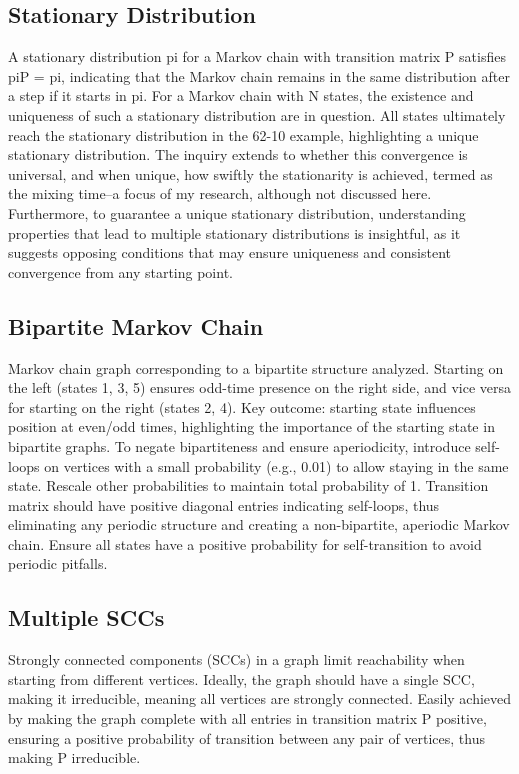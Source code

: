 \subsection*{Stationary Distribution}
A stationary distribution pi for a Markov chain with transition matrix P satisfies piP = pi, indicating that the Markov chain remains in the same distribution after a step if it starts in pi.
For a Markov chain with N states, the existence and uniqueness of such a stationary distribution are in question.
All states ultimately reach the stationary distribution in the 62-10 example, highlighting a unique stationary distribution.
The inquiry extends to whether this convergence is universal, and when unique, how swiftly the stationarity is achieved, termed as the mixing time--a focus of my research, although not discussed here.
Furthermore, to guarantee a unique stationary distribution, understanding properties that lead to multiple stationary distributions is insightful, as it suggests opposing conditions that may ensure uniqueness and consistent convergence from any starting point.

\subsection*{Bipartite Markov Chain}
Markov chain graph corresponding to a bipartite structure analyzed.
Starting on the left (states 1, 3, 5) ensures odd-time presence on the right side, and vice versa for starting on the right (states 2, 4).
Key outcome: starting state influences position at even/odd times, highlighting the importance of the starting state in bipartite graphs.
To negate bipartiteness and ensure aperiodicity, introduce self-loops on vertices with a small probability (e.g., 0.01) to allow staying in the same state.
Rescale other probabilities to maintain total probability of 1.
Transition matrix should have positive diagonal entries indicating self-loops, thus eliminating any periodic structure and creating a non-bipartite, aperiodic Markov chain.
Ensure all states have a positive probability for self-transition to avoid periodic pitfalls.

\subsection*{Multiple SCCs}
Strongly connected components (SCCs) in a graph limit reachability when starting from different vertices.
Ideally, the graph should have a single SCC, making it irreducible, meaning all vertices are strongly connected.
Easily achieved by making the graph complete with all entries in transition matrix P positive, ensuring a positive probability of transition between any pair of vertices, thus making P irreducible.

